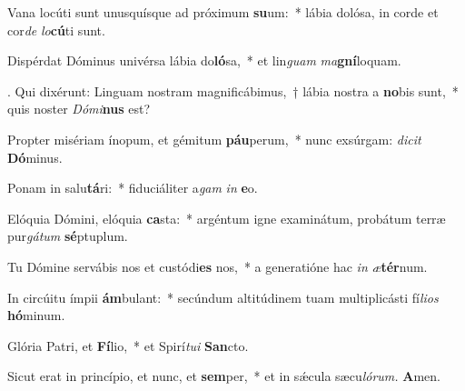 \item Vana locúti sunt unusquísque ad próximum \textbf{su}um:~* lábia dolósa, in corde et cor\textit{de} \textit{lo}\textbf{cú}ti sunt.
\item Dispérdat Dóminus univérsa lábia do\textbf{ló}sa,~* et lin\textit{guam} \textit{ma}\textbf{gní}loquam.
\item. Qui dixérunt: Linguam nostram magnificábimus,~† lábia nostra a \textbf{no}bis sunt,~* quis noster \textit{Dómi}\textbf{nus} est?
\item Propter misériam ínopum, et gémitum \textbf{páu}perum,~* nunc exsúrgam: \textit{dicit} \textbf{Dó}minus.
\item Ponam in salu\textbf{tá}ri:~* fiduciáliter a\textit{gam} \textit{in} \textbf{e}o.
\item Elóquia Dómini, elóquia \textbf{ca}sta:~* argéntum igne examinátum, probátum terræ pur\textit{gátum} \textbf{sé}ptuplum.
\item Tu Dómine servábis nos et custódi\textbf{es} nos,~* a generatióne hac \textit{in} \textit{æ}\textbf{tér}num.
\item In circúitu ímpii \textbf{ám}bulant:~* secúndum altitúdinem tuam multiplicásti fí\hspace{0.02em}\textit{lios} \textbf{hó}minum.
\item Glória Patri, et \textbf{Fí}lio,~* et Spirí\hspace{0.03em}\textit{tui} \textbf{San}cto.
\item Sicut erat in princípio, et nunc, et \textbf{sem}per,~* et in sǽcula sæcu\hspace{0.03em}\textit{lórum.} \textbf{A}men.
